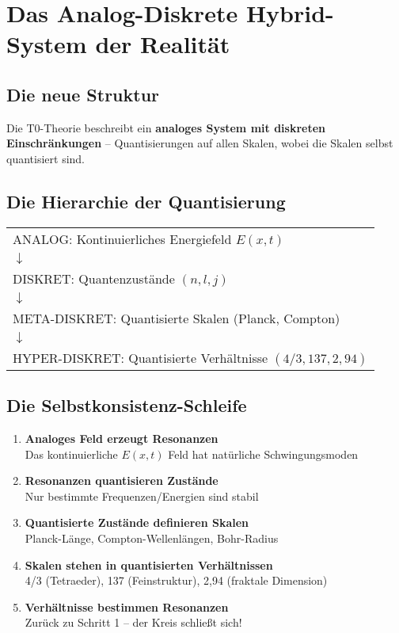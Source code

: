 \documentclass[12pt,a4paper]{article}
\begin{document}
	\section{Das Analog-Diskrete Hybrid-System der Realität}
	
	\subsection{Die neue Struktur}
	
	Die T0-Theorie beschreibt ein \textbf{analoges System mit diskreten Einschränkungen} -- Quantisierungen auf allen Skalen, wobei die Skalen selbst quantisiert sind.
	
	\subsection{Die Hierarchie der Quantisierung}
	
	\begin{center}
		\begin{tabular}{l}
			ANALOG: Kontinuierliches Energiefeld $E(x,t)$\\
			$\downarrow$\\
			DISKRET: Quantenzustände $(n, l, j)$\\
			$\downarrow$\\
			META-DISKRET: Quantisierte Skalen (Planck, Compton)\\
			$\downarrow$\\
			HYPER-DISKRET: Quantisierte Verhältnisse $(4/3, 137, 2{,}94)$
		\end{tabular}
	\end{center}
	
	\subsection{Die Selbstkonsistenz-Schleife}
	
	\begin{enumerate}
		\item \textbf{Analoges Feld erzeugt Resonanzen}\\
		Das kontinuierliche $E(x,t)$ Feld hat natürliche Schwingungsmoden
		
		\item \textbf{Resonanzen quantisieren Zustände}\\
		Nur bestimmte Frequenzen/Energien sind stabil
		
		\item \textbf{Quantisierte Zustände definieren Skalen}\\
		Planck-Länge, Compton-Wellenlängen, Bohr-Radius
		
		\item \textbf{Skalen stehen in quantisierten Verhältnissen}\\
		4/3 (Tetraeder), 137 (Feinstruktur), 2{,}94 (fraktale Dimension)
		
		\item \textbf{Verhältnisse bestimmen Resonanzen}\\
		Zurück zu Schritt 1 -- der Kreis schließt sich!
	\end{enumerate}
	
\end{document}
